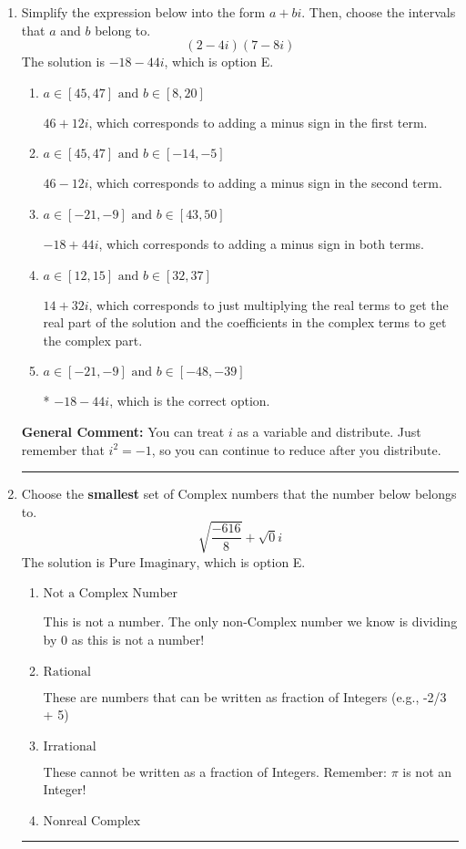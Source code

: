 \documentclass{extbook}[14pt]
\newcommand{\litem}[1]{\item #1

\rule{\textwidth}{0.4pt}}
\begin{document}
\begin{enumerate}\litem{
Simplify the expression below into the form $a+bi$. Then, choose the intervals that $a$ and $b$ belong to.
\[ (2 - 4 i)(7 - 8 i) \]The solution is \( -18 - 44 i \), which is option E.\begin{enumerate}[label=\Alph*.]
\item \( a \in [45, 47] \text{ and } b \in [8, 20] \)

 $46 + 12 i$, which corresponds to adding a minus sign in the first term.
\item \( a \in [45, 47] \text{ and } b \in [-14, -5] \)

 $46 - 12 i$, which corresponds to adding a minus sign in the second term.
\item \( a \in [-21, -9] \text{ and } b \in [43, 50] \)

 $-18 + 44 i$, which corresponds to adding a minus sign in both terms.
\item \( a \in [12, 15] \text{ and } b \in [32, 37] \)

 $14 + 32 i$, which corresponds to just multiplying the real terms to get the real part of the solution and the coefficients in the complex terms to get the complex part.
\item \( a \in [-21, -9] \text{ and } b \in [-48, -39] \)

* $-18 - 44 i$, which is the correct option.
\end{enumerate}

\textbf{General Comment:} You can treat $i$ as a variable and distribute. Just remember that $i^2=-1$, so you can continue to reduce after you distribute.
}
\litem{
Choose the \textbf{smallest} set of Complex numbers that the number below belongs to.
\[ \sqrt{\frac{-616}{8}}+\sqrt{0}i \]The solution is \( \text{Pure Imaginary} \), which is option E.\begin{enumerate}[label=\Alph*.]
\item \( \text{Not a Complex Number} \)

This is not a number. The only non-Complex number we know is dividing by 0 as this is not a number!
\item \( \text{Rational} \)

These are numbers that can be written as fraction of Integers (e.g., -2/3 + 5)
\item \( \text{Irrational} \)

These cannot be written as a fraction of Integers. Remember: $\pi$ is not an Integer!
\item \( \text{Nonreal Complex} \)


\end{enumerate}}
\end{enumerate}
\end{document}
